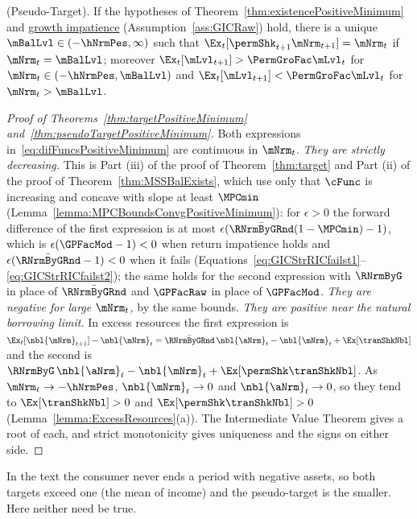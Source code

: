 \documentclass[\econtexRoot/BufferStockTheory]{subfiles}
\begin{document}
\begin{theorem}(Pseudo-Target).\label{thm:pseudoTargetPositiveMinimum}
If the hypotheses of Theorem~\ref{thm:existencePositiveMinimum} and \hyperlink{GICRaw}{growth impatience} (Assumption~\ref{ass:GICRaw}) hold, there is a unique $\mBalLvl\in(-\hNrmPes,\infty)$ such that $\Ex_{t}[\permShk_{t+1}\mNrm_{t+1}]=\mNrm_{t}$ if $\mNrm_{t}=\mBalLvl$; moreover $\Ex_{t}[\mLvl_{t+1}]>\PermGroFac\mLvl_{t}$ for $\mNrm_{t}\in(-\hNrmPes,\mBalLvl)$ and $\Ex_{t}[\mLvl_{t+1}]<\PermGroFac\mLvl_{t}$ for $\mNrm_{t}>\mBalLvl$.
\end{theorem}

\begin{proof}[Proof of Theorems~\ref{thm:targetPositiveMinimum} and~\ref{thm:pseudoTargetPositiveMinimum}]
Both expressions in~\eqref{eq:difFuncsPositiveMinimum} are continuous in $\mNrm_{t}$.
\emph{They are strictly decreasing.}
This is Part (iii) of the proof of Theorem~\ref{thm:target} and Part (ii) of the proof of Theorem~\ref{thm:MSSBalExists}, which use only that $\cFunc$ is increasing and concave with slope at least $\MPCmin$ (Lemma~\ref{lemma:MPCBoundsConvgPositiveMinimum}): for $\epsilon>0$ the forward difference of the first expression is at most $\epsilon(\bar{\RNrmByGRnd}(1-\MPCmin)-1)$, which is $\epsilon(\GPFacMod-1)<0$ when return impatience holds and $\epsilon(\bar{\RNrmByGRnd}-1)<0$ when it fails (Equations~\eqref{eq:GICStrRICfailst1}--\eqref{eq:GICStrRICfailst2}); the same holds for the second expression with $\RNrmByG$ in place of $\bar{\RNrmByGRnd}$ and $\GPFacRaw$ in place of $\GPFacMod$.
\emph{They are negative for large $\mNrm_{t}$,} by the same bounds.
\emph{They are positive near the natural borrowing limit.}
In excess resources the first expression is $\Ex_{t}[\nbl{\mNrm}_{t+1}]-\nbl{\mNrm}_{t}=\bar{\RNrmByGRnd}\,\nbl{\aNrm}_{t}-\nbl{\mNrm}_{t}+\Ex[\tranShkNbl]$ and the second is $\RNrmByG\,\nbl{\aNrm}_{t}-\nbl{\mNrm}_{t}+\Ex[\permShk\tranShkNbl]$.
As $\mNrm_{t}\rightarrow-\hNrmPes$, $\nbl{\mNrm}_{t}\rightarrow 0$ and $\nbl{\aNrm}_{t}\rightarrow 0$, so they tend to $\Ex[\tranShkNbl]>0$ and $\Ex[\permShk\tranShkNbl]>0$ (Lemma~\ref{lemma:ExcessResources}(a)).
The Intermediate Value Theorem gives a root of each, and strict monotonicity gives uniqueness and the signs on either side.
\end{proof}

In the text the consumer never ends a period with negative assets, so both targets exceed one (the mean of income) and the pseudo-target is the smaller.
Here neither need be true.
\end{document}
